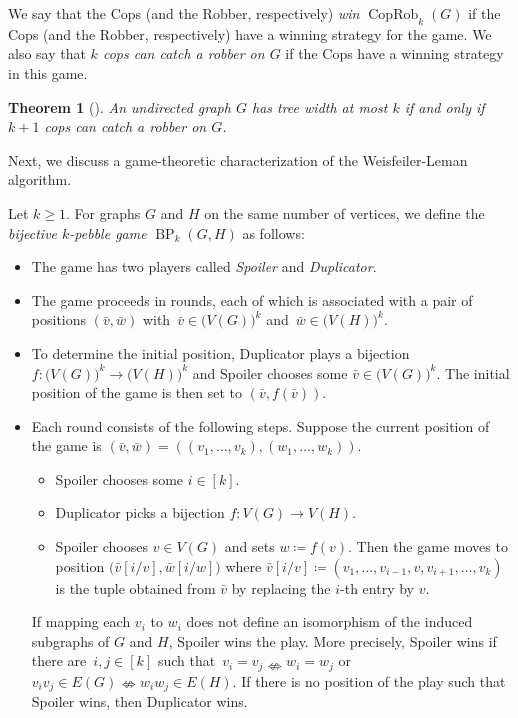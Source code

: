 \PassOptionsToPackage{dvipsnames,svgnames}{xcolor}\documentclass[10pt,a4paper]{article}
\newtheorem{theorem}{Theorem}[section]
\DeclareMathOperator{\CopRob}{CopRob}
\DeclareMathOperator{\BP}{BP}
\begin{document}
We say that the Cops (and the Robber, respectively) \emph{win $\CopRob_k(G)$} if the Cops (and the Robber, respectively) have a winning strategy for the game.
We also say that \emph{$k$ cops can catch a robber on $G$} if the Cops have a winning strategy in this game.

\begin{theorem}[\cite{SeymourT93}]
 \label{thm:cops-and-robbers-characterization-of-treewidth}
 An undirected graph $G$ has tree width at most $k$ if and only if $k+1$ cops can catch a robber on $G$.
\end{theorem}

Next, we discuss a game-theoretic characterization of the Weisfeiler-Leman algorithm.

Let $k \geq 1$.
For graphs $G$ and $H$ on the same number of vertices, we define the \emph{bijective $k$-pebble game} $\BP_{k}(G,H)$ as follows:
\begin{itemize}
 \item The game has two players called \emph{Spoiler} and \emph{Duplicator}.
 \item The game proceeds in rounds, each of which is associated with a pair of positions
 $(\bar v,\bar w)$ with~$\bar v \in \big(V(G)\big)^k$ and~$\bar w \in \big(V(H)\big)^k$.
 \item To determine the initial position, Duplicator plays a bijection $f\colon \big(V(G)\big)^k \rightarrow \big(V(H)\big)^k$ and Spoiler chooses some $\bar v \in \big(V(G)\big)^k$.
  The initial position of the game is then set to $(\bar v,f(\bar v))$.
 \item Each round consists of the following steps.
  Suppose the current position of the game is $(\bar v,\bar w) = ((v_1,\ldots,v_k),(w_1,\ldots,w_k))$.
  \begin{itemize}
   \item[(S)] Spoiler chooses some $i \in [k]$.
   \item[(D)] Duplicator picks a bijection $f\colon V(G) \rightarrow V(H)$.
   \item[(S)] Spoiler chooses $v \in V(G)$ and sets $w \coloneqq f(v)$.
    Then the game moves to position $\big(\bar v[i/v], \bar w[i/w]\big)$ where $\bar v[i/v] \coloneqq (v_1,\dots,v_{i-1},v,v_{i+1},\dots,v_k)$ is the tuple obtained from $\bar v$ by replacing the $i$-th entry by $v$.
  \end{itemize}

  If mapping each $v_i$ to $w_i$ does not define an isomorphism of the induced subgraphs of $G$ and $H$, Spoiler wins the play.
  More precisely, Spoiler wins if there are~$i,j\in [k]$ such that~$v_i = v_j \nLeftrightarrow w_i =w_j$ or~$v_iv_j \in E(G) \nLeftrightarrow w_iw_j \in E(H)$.
  If there is no position of the play such that Spoiler wins, then Duplicator wins.
\end{itemize}
\end{document}
